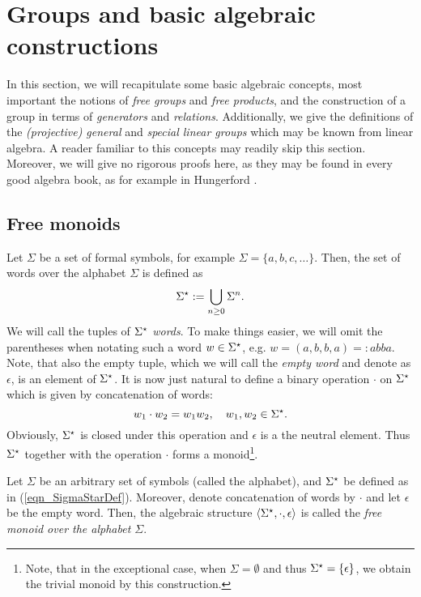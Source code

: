 \section{Groups and basic algebraic constructions}

In this section, we will recapitulate some basic algebraic concepts, most important the notions of \emph{free groups} and \emph{free products}, and the construction of a group in terms of \emph{generators} and \emph{relations}. Additionally, we give the definitions of the \emph{(projective) general} and \emph{special linear groups} which may be known from linear algebra. A reader familiar to this concepts may readily skip this section. Moreover, we will give no rigorous proofs here, as they may be found in every good algebra book, as for example in Hungerford \cite{hungerford1974algebra}.

\subsection{Free monoids}
Let $\Sigma$ be a set of formal symbols, for example $\Sigma = \{a, b, c, \dots\}$. Then, the set of words over the alphabet $\Sigma$ is defined as
\begin{equation}
\label{eqn_SigmaStarDef}
{\Sigma}^{\star} := \bigcup_{n\ge0} \Sigma^n.
\end{equation}
We will call the tuples of ${\Sigma}^{\star}$ \emph{words}. To make things easier, we will omit the parentheses when notating such a word $w \in {\Sigma}^{\star}$, e.g. $w = (a,b,b,a) =: abba$. Note, that also the empty tuple, which we will call the \emph{empty word} and denote as $\epsilon$, is an element of ${\Sigma}^{\star}$. It is now just natural to define a binary operation $\cdot$ on ${\Sigma}^{\star}$ which is given by concatenation of words:
\begin{equation*}
w_1 \cdot w_2 = w_1 w_2, \quad w_1, w_2 \in {\Sigma}^{\star}.
\end{equation*}
Obviously, ${\Sigma}^{\star}$ is closed under this operation and $\epsilon$ is a the neutral element. Thus ${\Sigma}^{\star}$ together with the operation $\cdot$ forms a monoid\footnote{Note, that in the exceptional case, when $\Sigma = \emptyset$ and thus ${\Sigma}^{\star} = \{\epsilon\}$, we obtain the trivial monoid by this construction.}. 

\begin{definition}
\label{dfn_FreeMonoid}
Let $\Sigma$ be an arbitrary set of symbols (called the alphabet), and ${\Sigma}^{\star}$ be defined as in (\ref{eqn_SigmaStarDef}). Moreover, denote concatenation of words by $\cdot$ and let $\epsilon$ be the empty word. Then, the algebraic structure $\langle {\Sigma}^{\star}, \cdot, \epsilon \rangle$ is called the \emph{free monoid over the alphabet $\Sigma$}.
\end{definition} 

